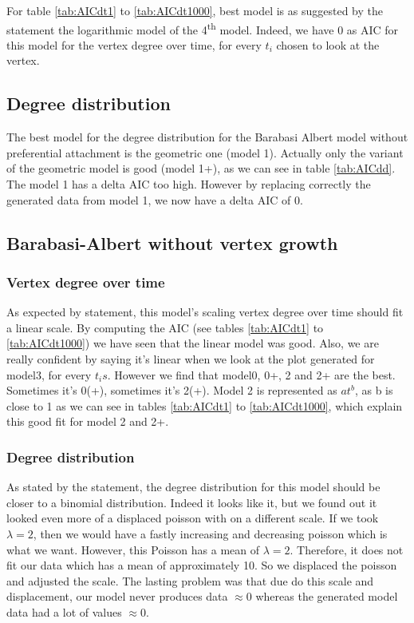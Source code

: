 \documentclass{article}
\begin{document}
For table \ref{tab:AICdt1} to \ref{tab:AICdt1000}, best model is as suggested by
the statement the logarithmic model of the 4\textsuperscript{th} model. Indeed,
we have 0 as AIC for this model for the vertex degree over time, for every
$t_i$ chosen to look at the vertex.


\subsection{Degree distribution}


The best model for the degree distribution for the Barabasi Albert model without
preferential attachment is the geometric one (model 1). Actually only the
variant of the geometric model is good (model 1+), as we can see in table
\ref{tab:AICdd}. The model 1 has a delta AIC too high. However by replacing
correctly the generated data from model 1, we now have a delta AIC of 0.



\subsection{Barabasi-Albert without vertex growth}

\subsubsection{Vertex degree over time}

As expected by statement, this model's scaling vertex degree over time should
fit a linear scale. By computing the AIC (see tables \ref{tab:AICdt1} to
\ref{tab:AICdt1000}) we have seen that the linear model was good. Also, we are
really confident by saying it's linear when we look at the plot generated for
model3, for every $t_is$. However we find that model0, 0+, 2 and 2+ are the
best. Sometimes it's 0(+), sometimes it's 2(+). Model 2 is represented as
$at^b$, as b is close to 1 as we can see in tables \ref{tab:AICdt1} to
\ref{tab:AICdt1000}, which explain this good fit for model 2 and 2+.

\subsubsection{Degree distribution}

As stated by the statement, the degree distribution for this model should be
closer to a binomial distribution. Indeed it looks like it, but we found out it
looked even more of a displaced poisson with on a different scale. If we took
$\lambda = 2$, then we would have a fastly increasing and decreasing poisson
which is what we want. However, this Poisson has a mean of $\lambda = 2$.
Therefore, it does not fit our data which has a mean of approximately 10.
So we displaced the poisson and adjusted the scale. The lasting problem was that
due do this scale and displacement, our model never produces data $\approx 0$
whereas the generated model data had a lot of values $\approx 0$.
\end{document}
